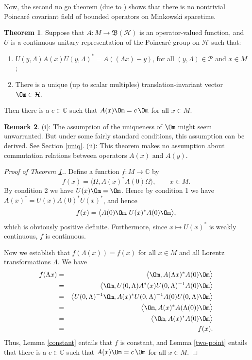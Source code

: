 \documentclass[12pt]{article}
\newcommand{\bh}{\mathfrak{B}(\mathcal{H})}
\theoremstyle{definition}
\newtheorem{thm}{Theorem}[section]
\theoremstyle{definition}
\newtheorem{note}[thm]{Remark}
\theoremstyle{remark}
\def\2#1{{\mathcal #1}}
\def\7#1{{\mathbb #1}}
\begin{document}
Now, the second no go theorem (due to \cite{wizi}) shows that there is no nontrivial
Poincar{\'e} covariant field of bounded operators on Minkowski spacetime.  

\begin{thm} Suppose that $A:M\to \bh$ is an operator-valued function, and $U$ is a
  continuous unitary representation of the Poincar{\'e} group on $\2H$ such that:
\begin{enumerate}
\item $U(y,\Lambda )A(x)U(y,\Lambda )^*=A((\Lambda x)-y)$, for all $(y,\Lambda )\in
  \2P$ and $x\in M$;
\item There is a unique (up to scalar multiples) translation-invariant vector $\Om
  \in \2H$.
\end{enumerate} Then there is a $c\in \7C$ such that $A(x)\Om =c\,\Om$ for all $x\in
M$.
\label{kami}
\end{thm}

\begin{note} (i): The assumption of the uniqueness of
  $\Om$ might seem unwarranted.  But under some fairly
  standard conditions, this assumption can be derived.
  See Section \ref{uniq}.  (ii): This theorem makes no
  assumption about commutation relations between
  operators $A(x)$ and $A(y)$.  \end{note}

\begin{proof}[Proof of Theorem \ref{kami}.] Define a function $f:M\to \7C$ by
  $$ f(x)= \bigl\langle \Omega ,A(x)^*A(0)\Omega \big\rangle  ,\qquad x\in M .$$
  By condition 2 we have $U(x)\Om =\Om$.  Hence by condition 1 we have
  $A(x)^*=U(x)A(0)^*U(x)^*$, and hence
$$ f(x) =\bigl\langle A(0)\Om ,U(x)^*A(0)\Om \bigr\rangle  , $$
which is obviously positive definite.  Furthermore, since $x\mapsto U(x)^*$ is weakly
continuous, $f$ is continuous.

Now we establish that $f(\Lambda (x))=f(x)$ for all $x\in M$ and all Lorentz
transformations $\Lambda$.  We have 
\begin{eqnarray*} 
  f(\Lambda x) &=& \bigl\langle \Om ,A(\Lambda x)^*A(0)\Om \bigr\rangle  \\
  &=& \bigl\langle \Om ,U(0,\Lambda )A^*(x)U(0,\Lambda )^{-1}A(0)\Om \bigr\rangle \\
  &=& \bigl\langle U(0,\Lambda )^{-1}\Om ,A(x)^*U(0,\Lambda )^{-1}A(0)U(0,\Lambda )\Om
  \bigr\rangle \\
  &=& \bigl\langle \Om ,A(x)^*A(\Lambda (0))\Om \bigr\rangle \\
  &=& \bigl\langle \Om ,A(x)^*A(0)\Om \bigr\rangle \\
  &=& f(x) .
\end{eqnarray*}
Thus, Lemma \ref{constant} entails that $f$ is constant, and Lemma \ref{two-point}
entails that there is a $c\in \7C$ such that $A(x)\Om =c\,\Om$ for all $x\in M$. 
\end{proof}
\end{document}
